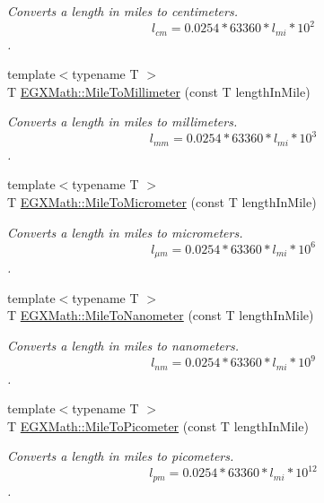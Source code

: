 \begin{DoxyCompactItemize}
\begin{DoxyCompactList}\small\item\em Converts a length in miles to centimeters. \[ l_{cm}=0.0254 * 63360 * l_{mi} * 10^{2} \]. \end{DoxyCompactList}\item 
{\footnotesize template$<$typename T $>$ }\\T \mbox{\hyperlink{group___e_g_x_math-_conversions-_length_conversions-_imperial-_mile-_s_i_gaaaf6dd30f919daf99f99e99422a8e547}{E\+G\+X\+Math\+::\+Mile\+To\+Millimeter}} (const T length\+In\+Mile)
\begin{DoxyCompactList}\small\item\em Converts a length in miles to millimeters. \[ l_{mm}=0.0254 * 63360 * l_{mi} * 10^{3} \]. \end{DoxyCompactList}\item 
{\footnotesize template$<$typename T $>$ }\\T \mbox{\hyperlink{group___e_g_x_math-_conversions-_length_conversions-_imperial-_mile-_s_i_ga59355064bc6419c5dc24f89bb13ec070}{E\+G\+X\+Math\+::\+Mile\+To\+Micrometer}} (const T length\+In\+Mile)
\begin{DoxyCompactList}\small\item\em Converts a length in miles to micrometers. \[ l_{\mu m}=0.0254 * 63360 * l_{mi} * 10^{6} \]. \end{DoxyCompactList}\item 
{\footnotesize template$<$typename T $>$ }\\T \mbox{\hyperlink{group___e_g_x_math-_conversions-_length_conversions-_imperial-_mile-_s_i_ga7c25082c389858e2dacd450005dc78c7}{E\+G\+X\+Math\+::\+Mile\+To\+Nanometer}} (const T length\+In\+Mile)
\begin{DoxyCompactList}\small\item\em Converts a length in miles to nanometers. \[ l_{nm}=0.0254 * 63360 * l_{mi} * 10^{9} \]. \end{DoxyCompactList}\item 
{\footnotesize template$<$typename T $>$ }\\T \mbox{\hyperlink{group___e_g_x_math-_conversions-_length_conversions-_imperial-_mile-_s_i_ga470a1271de988c28cb4851e5930d99da}{E\+G\+X\+Math\+::\+Mile\+To\+Picometer}} (const T length\+In\+Mile)
\begin{DoxyCompactList}\small\item\em Converts a length in miles to picometers. \[ l_{pm}=0.0254 * 63360 * l_{mi} * 10^{12} \]. \end{DoxyCompactList}\item 

\end{DoxyCompactItemize}
